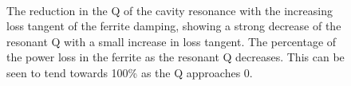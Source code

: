 \begin{figure}
\begin{center}
\\
\end{center}
\caption{ The reduction in the Q of the cavity resonance with the increasing loss tangent of the ferrite damping, showing a strong decrease of the resonant Q with a small increase in loss tangent.  The percentage of the power loss in the ferrite as the resonant Q decreases. This can be seen to tend towards 100\% as the Q approaches 0.}
\label{fig:no_screen_res_alterations}
\end{figure}

